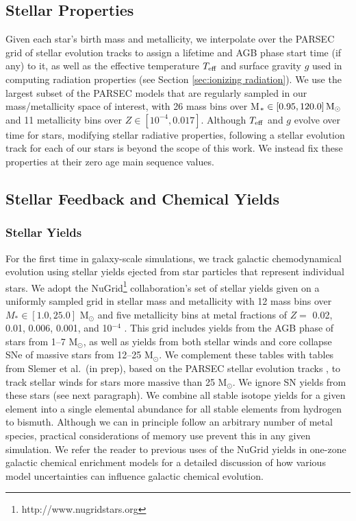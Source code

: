 \documentclass[fleqn,usenatbib,useAMS]{mnras}
\begin{document}
\subsection{Stellar Properties}
\label{sec:properties}
Given each star's birth mass and metallicity, we interpolate over the PARSEC grid of stellar evolution tracks \citep{Bressan2012} to assign a lifetime and AGB phase start time (if any) to it, as well as the effective temperature $T_{\rm eff}$ and surface gravity $g$ used in computing radiation properties (see Section \ref{sec:ionizing radiation}). We use the largest subset of the PARSEC models that are regularly sampled in our mass/metallicity space of interest, with 26 mass bins over M$_{*} \in \left[0.95, 120.0 \right] {\rm M_{\odot}}$ and 11 metallicity bins over $Z \in \left[10^{-4}, 0.017 \right]$. Although $T_{\rm eff}$ and $g$ evolve over time for stars, modifying stellar radiative properties, following a stellar evolution track for each of our stars is beyond the scope of this work. We instead fix these properties at their zero age main sequence values.

\subsection{Stellar Feedback and Chemical Yields}

\subsubsection{Stellar Yields}
\label{sec:yields}
For the first time in galaxy-scale simulations, we track galactic chemodynamical evolution using stellar yields ejected from star particles that represent individual stars. We adopt the NuGrid\footnote{http://www.nugridstars.org} collaboration's set of stellar yields given on a uniformly sampled grid in stellar mass and metallicity with 12 mass bins over $M_{*} \in \left[1.0, 25.0\right]$ M$_{\odot}$ and five metallicity bins at metal fractions of $Z =$ 0.02, 0.01, 0.006, 0.001, and 10$^{-4}$ \citep{Pignatari2016, Ritter2017}. This grid includes yields from the AGB phase of stars from 1--7 M$_{\odot}$, as well as yields from both stellar winds and core collapse SNe of massive stars from 12--25 M$_{\odot}$. We complement these tables with tables from Slemer et al.\ (in prep), based on the PARSEC stellar evolution tracks \citep{Bressan2012, Tang2014}, to track stellar winds for stars more massive than 25 M$_{\odot}$. We ignore SN yields from these stars (see next paragraph). We combine all stable isotope yields for a given element into a single elemental abundance for all stable elements from hydrogen to bismuth. Although we can in principle follow an arbitrary number of metal species, practical considerations of memory use prevent this in any given simulation. We refer the reader to previous uses of the NuGrid yields in one-zone galactic chemical enrichment models \citep{Cote2016,  Cote2016_feb,Cote2017a} for a detailed discussion of how various model uncertainties can influence galactic chemical evolution.
\end{document}
